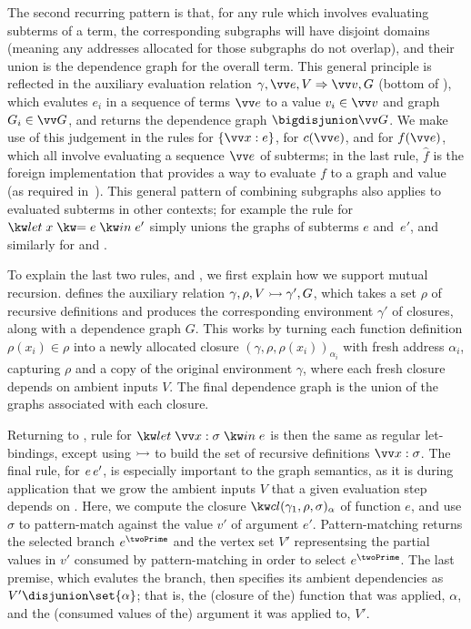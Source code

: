 The second recurring pattern is that, for any rule which involves evaluating subterms of a term, the
corresponding subgraphs will have disjoint domains (meaning any addresses allocated for those subgraphs do not
overlap), and their union is the dependence graph for the overall term. This general principle is reflected in
the auxiliary evaluation relation $\gamma, \seq{e}, V \evalS \seq{v}, G$ (bottom of ), which
evalutes $e_i$ in a sequence of terms $\seq{e}$ to a value $v_i \in \seq{v}$ and graph $G_i \in \seq{G}$, and
returns the dependence graph $\textstyle{\bigdisjunion} \seq{G}$. We make use of this judgement in the rules
 for $\exRec{\seq{\bind{x}{e}}}$,  for $c(\seq{e})$, and
 for $f(\seq{e})$, which all involve evaluating a sequence $\seq{e}$ of
subterms; in the last rule, $\hat{f}$ is the foreign implementation that provides a way to evaluate $f$ to a
graph and value (as required in~). This general pattern of combining subgraphs also
applies to evaluated subterms in other contexts; for example the  rule for
$\exLet{x}{e}{e'}$ simply unions the graphs of subterms $e$ and~$e'$, and similarly for
 and .

To explain the last two rules,  and  , we first explain how
we support mutual recursion.  defines the auxiliary relation $\gamma, \rho, V
\rightarrowtail \gamma', G$, which takes a set $\rho$ of recursive definitions and produces the corresponding
environment $\gamma'$ of closures, along with a dependence graph $G$. This works by turning each function
definition $\rho(x_i) \in \rho$ into a newly allocated closure $(\gamma, \rho, \rho(x_i))_{\alpha_i}$ with
fresh address ${\alpha_i}$, capturing $\rho$ and a copy of the original environment $\gamma$, where each fresh
closure depends on ambient inputs $V$. The final dependence graph is the union of the graphs associated with
each closure.

Returning to , rule   for  $\exLetRec{\seq{\bind{x}{\sigma}}}{e}$
is then the same as regular let-bindings, except using $\rightarrowtail$ to build the set of recursive definitions
$\seq{\bind{x}{\sigma}}$. The final rule,  for ${e}\,{e'}$, is especially important
to the graph semantics, as it is during application that we grow the ambient inputs $V$ that a given
evaluation step depends on . Here, we compute the closure
$\annClosure{\gamma_1}{\rho}{\sigma}{\alpha}$ of function $e$, and use $\sigma$ to pattern-match against the
value $v'$ of argument $e'$. Pattern-matching returns the selected branch $e^\twoPrime$ and the vertex set
$V'$ representsing the partial values in $v'$ consumed by pattern-matching in order to select $e^\twoPrime$.
The last premise, which evalutes the branch, then specifies its ambient dependencies as $V' \disjunion
\set{\alpha}$; that is, the (closure of the) function that was applied, $\alpha$, and the (consumed values of
the) argument it was applied to, $V'$.

